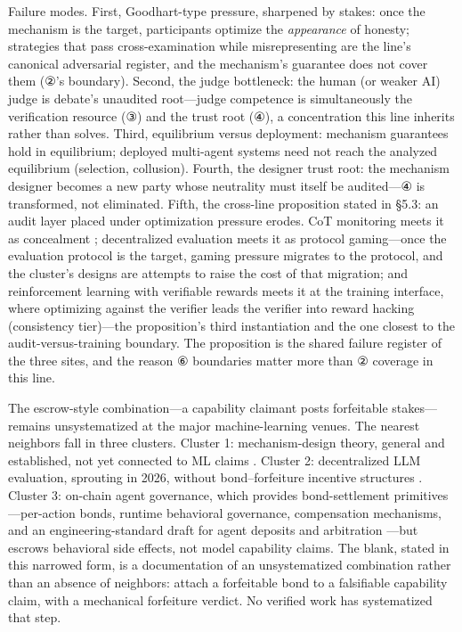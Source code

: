 \documentclass[11pt,a4paper]{article}
\begin{document}
Failure modes. First, Goodhart-type pressure, sharpened by stakes: once the mechanism is the target, participants optimize the \textit{appearance} of honesty; strategies that pass cross-examination while misrepresenting are the line's canonical adversarial register, and the mechanism's guarantee does not cover them (②'s boundary). Second, the judge bottleneck: the human (or weaker AI) judge is debate's unaudited root—judge competence is simultaneously the verification resource (③) and the trust root (④), a concentration this line inherits rather than solves. Third, equilibrium versus deployment: mechanism guarantees hold in equilibrium; deployed multi-agent systems need not reach the analyzed equilibrium (selection, collusion). Fourth, the designer trust root: the mechanism designer becomes a new party whose neutrality must itself be audited—④ is transformed, not eliminated. Fifth, the cross-line proposition stated in §5.3: an audit layer placed under optimization pressure erodes. CoT monitoring meets it as concealment \cite{key30}; decentralized evaluation meets it as protocol gaming—once the evaluation protocol is the target, gaming pressure migrates to the protocol, and the cluster's designs \cite{key44,key45,key46} are attempts to raise the cost of that migration; and reinforcement learning with verifiable rewards meets it at the training interface, where optimizing against the verifier leads the verifier into reward hacking \cite{key47} (consistency tier)—the proposition's third instantiation and the one closest to the audit-versus-training boundary. The proposition is the shared failure register of the three sites, and the reason ⑥ boundaries matter more than ② coverage in this line.

The escrow-style combination—a capability claimant posts forfeitable stakes—remains unsystematized at the major machine-learning venues. The nearest neighbors fall in three clusters. Cluster 1: mechanism-design theory, general and established, not yet connected to ML claims \cite{key43}. Cluster 2: decentralized LLM evaluation, sprouting in 2026, without bond–forfeiture incentive structures \cite{key44,key45,key46}. Cluster 3: on-chain agent governance, which provides bond-settlement primitives—per-action bonds, runtime behavioral governance, compensation mechanisms, and an engineering-standard draft for agent deposits and arbitration \cite{key48,key49,key50,key51}—but escrows behavioral side effects, not model capability claims. The blank, stated in this narrowed form, is a documentation of an unsystematized combination rather than an absence of neighbors: attach a forfeitable bond to a falsifiable capability claim, with a mechanical forfeiture verdict. No verified work has systematized that step.
\end{document}
